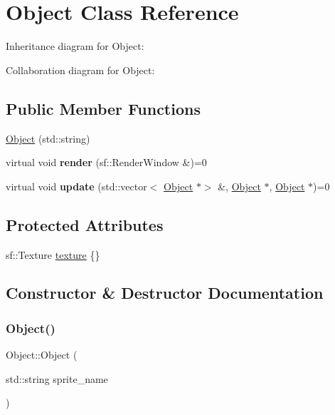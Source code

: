 \hypertarget{classObject}{}\section{Object Class Reference}
\label{classObject}


Inheritance diagram for Object\+:


Collaboration diagram for Object\+:
\subsection*{Public Member Functions}
\begin{DoxyCompactItemize}
\item 
\hyperlink{classObject_a9726153b1164522a3244fcb885870a99}{Object} (std\+::string)
\item 
\mbox{\label{classObject_abeb881d0995219c2948b4efe6236fa16}} 
virtual void {\bfseries render} (sf\+::\+Render\+Window \&)=0
\item 
\mbox{\label{classObject_a97f3f4907bfea43c1d094e7a20a78c8b}} 
virtual void {\bfseries update} (std\+::vector$<$ \hyperlink{classObject}{Object} $\ast$$>$ \&, \hyperlink{classObject}{Object} $\ast$, \hyperlink{classObject}{Object} $\ast$)=0
\end{DoxyCompactItemize}
\subsection*{Protected Attributes}
\begin{DoxyCompactItemize}
\item 
sf\+::\+Texture \hyperlink{classObject_a8abc6192982ee39b2dc9d9b05cc155ee}{texture} \{\}
\end{DoxyCompactItemize}


\subsection{Constructor \& Destructor Documentation}
\mbox{\label{classObject_a9726153b1164522a3244fcb885870a99}} 
\subsubsection{\texorpdfstring{Object()}{Object()}}
{\footnotesize\ttfamily Object\+::\+Object (\begin{DoxyParamCaption}\item[{std\+::string}]{sprite\+\_\+name }\end{DoxyParamCaption})}

